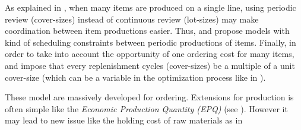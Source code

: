 As explained in \cite{Eynan2007}, when many items are produced on a single line, using periodic review (\ie cover-sizes) instead of continuous review (\ie lot-sizes) may make coordination between item productions easier.
Thus, \cite{Madigan1968} and \cite{Chiu2014} propose models with kind of scheduling constraints between periodic productions of items.
Finally, in order to take into account the opportunity of one ordering cost for many items, \cite{Bomberger1966} and \cite{Goyal1974} impose that every replenishment cycles (cover-sizes) be a multiple of a unit cover-size (which can be a variable in the optimization process like in \cite{Silver1976}).


\medskip


These model are massively developed for ordering.
Extensions for production is often simple like the \emph{Economic Production Quantity (EPQ)} (see \cite{Taft1918}).
However it may lead to new issue like the holding cost of raw materials as in \cite{Lin2013}









